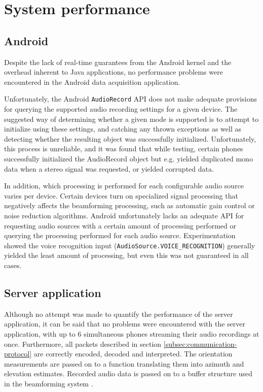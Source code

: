 \documentclass[a4paper, notitlepage]{report}
\begin{document}
\section{System performance}
\subsection{Android}
Despite the lack of real-time guarantees from the Android kernel and the overhead inherent to Java applications, no performance problems were encountered in the Android data acquisition application.

Unfortunately, the Android \texttt{AudioRecord} API does not make adequate provisions for querying the supported audio recording settings for a given device. The suggested way of determining whether a given mode is supported is to attempt to initialize using these settings, and catching any thrown exceptions as well as detecting whether the resulting object was successfully initialized. Unfortunately, this process is unreliable, and it was found that while testing, certain phones successfully initialized the AudioRecord object but e.g. yielded duplicated mono data when a stereo signal was requested, or yielded corrupted data.

In addition, which processing is performed for each configurable audio source varies per device. Certain devices turn on specialized signal processing that negatively affects the beamforming processing, such as automatic gain control or noise reduction algorithms. Android unfortunately lacks an adequate API for requesting audio sources with a certain amount of processing performed or querying the processing performed for each audio source. Experimentation showed the voice recognition input (\texttt{AudioSource.VOICE\_RECOGNITION}) generally yielded the least amount of processing, but even this was not guaranteed in all cases.

\subsection{Server application}
Although no attempt was made to quantify the performance of the server application, it can be said that no problems were encountered with the server application, with up to 6 simultaneous phones streaming their audio recordings at once. Furthermore, all packets described in section \ref{subsec:communication-protocol} are correctly encoded, decoded and interpreted. The orientation measurements are passed on to a function translating them into azimuth and elevation estimates. Recorded audio data is passed on to a buffer structure used in the beamforming system \cite{BAP:ErikNiels}.
\end{document}
